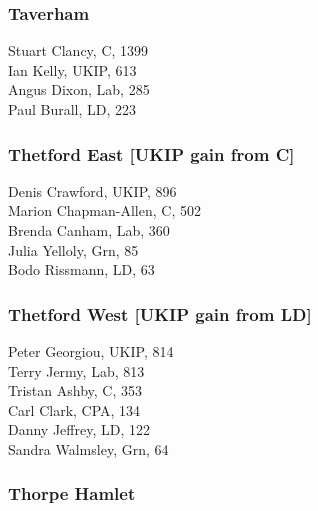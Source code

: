\documentclass[a4paper,openany,10pt]{book}
\begin{document}
\subsubsection*{Taverham}



Stuart Clancy, C, 1399\\
Ian Kelly, UKIP, 613\\
Angus Dixon, Lab, 285\\
Paul Burall, LD, 223\\


\subsubsection*{Thetford East \hspace*{\fill}\nolinebreak[1]%
\enspace\hspace*{\fill}
[UKIP gain from C]}



Denis Crawford, UKIP, 896\\
{Marion Chapman-Allen}, C, 502\\
Brenda Canham, Lab, 360\\
Julia Yelloly, Grn, 85\\
Bodo Rissmann, LD, 63\\


\subsubsection*{Thetford West \hspace*{\fill}\nolinebreak[1]%
\enspace\hspace*{\fill}
[UKIP gain from LD]}



Peter Georgiou, UKIP, 814\\
Terry Jermy, Lab, 813\\
Tristan Ashby, C, 353\\
Carl Clark, CPA, 134\\
Danny Jeffrey, LD, 122\\
Sandra Walmsley, Grn, 64\\


\subsubsection*{Thorpe Hamlet}
\end{document}
